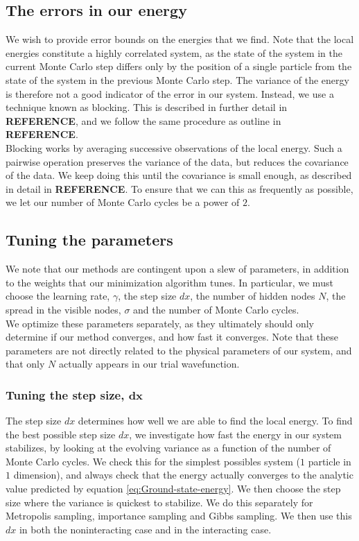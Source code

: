 \documentclass[a4paper, 10pt]{article}
\begin{document}
	\subsection{The errors in our energy}
	We wish to provide error bounds on the energies that we find. Note that the local energies constitute a highly correlated system, as the state of the system in the current Monte Carlo step differs only by the position of a single particle from the state of the system in the previous Monte Carlo step. The variance of the energy is therefore not a good indicator of the error in our system. Instead, we use a technique known as blocking. This is described in further detail in \textbf{REFERENCE}, and we follow the same procedure as outline in \textbf{REFERENCE}.\\
	\linebreak
	Blocking works by averaging successive observations of the local energy. Such a pairwise operation preserves the variance of the data, but reduces the covariance of the data. We keep doing this until the covariance is small enough, as described in detail in \textbf{REFERENCE}. To ensure that we can this as frequently as possible, we let our number of Monte Carlo cycles be a power of $2$. 
	\subsection{Tuning the parameters}
	We note that our methods are contingent upon a slew of parameters, in addition to the weights that our minimization algorithm tunes. In particular, we must choose the learning rate, $\gamma$, the step size $dx$, the number of hidden nodes $N$, the spread in the visible nodes, $\sigma$ and the number of Monte Carlo cycles.\\
	\linebreak
	We optimize these parameters separately, as they ultimately should only determine if our method converges, and how fast it converges. Note that these parameters are not directly related to the physical parameters of our system, and that only $N$ actually appears in our trial wavefunction.
	\subsubsection{Tuning the step size, $\boldsymbol{dx}$}
	The step size $dx$ determines how well we are able to find the local energy.
	To find the best possible step size $dx$, we investigate how fast the energy in our system stabilizes, by looking at the evolving variance as a function of the number of Monte Carlo cycles. We check this for the simplest possibles system ($1$ particle in $1$ dimension), and always check that the energy actually converges to the analytic value predicted by equation \ref{eq:Ground-state-energy}. We then choose the step size where the variance is quickest to stabilize. We do this separately for Metropolis sampling, importance sampling and Gibbs sampling. We then use this $dx$ in both the noninteracting case and in the interacting case.
\end{document}
